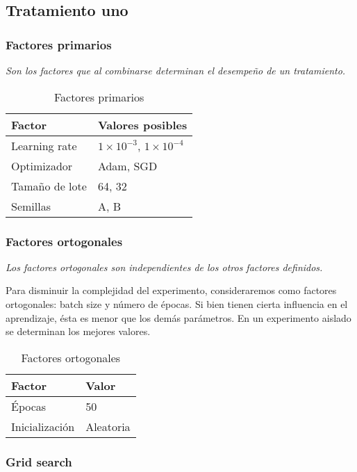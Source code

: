 \documentclass[12pt,twoside,letterpaper]{article}
\begin{document}
\subsection{Tratamiento uno}

\subsubsection{Factores primarios}

\emph{Son los factores que al combinarse determinan el desempeño de un tratamiento.}

\begin{table}[h]
\centering
\begin{tabular}{|l|l|}
\hline
\textbf{Factor}     & \textbf{Valores posibles}   \\ \hline
Learning rate & $1 \times 10^{-3}$,  $1 \times 10^{-4}$    \\ \hline
Optimizador & Adam, SGD    \\ \hline
Tamaño de lote & 64, 32 \\ \hline
Semillas & A, B \\ \hline
\end{tabular}
\caption{Factores primarios}
\end{table}

\subsubsection{Factores ortogonales}

\emph{Los factores ortogonales son independientes de los otros factores definidos.}

Para disminuir la complejidad del experimento, consideraremos como factores ortogonales: batch size y número de épocas. Si bien tienen cierta influencia en el aprendizaje, ésta es menor que los demás parámetros. En un experimento aislado se determinan los mejores valores. 

\begin{table}[h]
\centering
\begin{tabular}{|l|l|}
\hline
\textbf{Factor}     & \textbf{Valor}   \\ \hline
Épocas     & 50    \\ \hline
Inicialización & Aleatoria \\ \hline
\end{tabular}
\caption{Factores ortogonales}
\end{table}

\subsubsection{Grid search}
\end{document}
